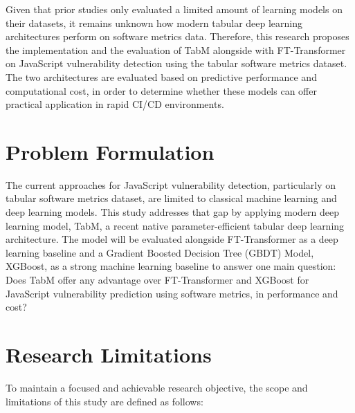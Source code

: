 Given that prior studies only evaluated a limited amount of learning models on their datasets, it remains unknown how modern tabular deep learning architectures perform on software metrics data. Therefore, this research proposes the implementation and the evaluation of TabM alongside with FT-Transformer on JavaScript vulnerability detection using the tabular software metrics dataset. The two architectures are evaluated based on predictive performance and computational cost, in order to determine whether these models can offer practical application in rapid CI/CD environments.


\section{Problem Formulation}


The current approaches for JavaScript vulnerability detection, particularly on tabular software metrics dataset, are limited to classical machine learning and deep learning models. This study addresses that gap by applying modern deep learning model, TabM, a recent native parameter-efficient tabular deep learning architecture. The model will be evaluated alongside FT-Transformer as a deep learning baseline and a Gradient Boosted Decision Tree (GBDT) Model, XGBoost, as a strong machine learning baseline to answer one main question: Does TabM offer any advantage over FT-Transformer and XGBoost for JavaScript vulnerability prediction using software metrics, in performance and cost?

\section{Research Limitations}


To maintain a focused and achievable research objective, the scope and limitations of this study are defined as follows:

